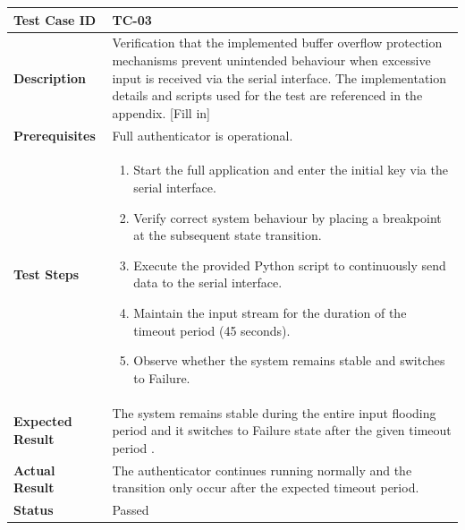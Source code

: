 \begin{table}[H]
\centering
\begin{tabular}{|p{3cm}|p{12cm}|}
\hline
\textbf{Test Case ID} & TC-03 \\ \hline
\textbf{Description} & Verification that the implemented buffer overflow protection mechanisms prevent unintended behaviour when excessive input is received via the serial interface. The implementation details and scripts used for the test are referenced in the appendix. [Fill in] \\ \hline
\textbf{Prerequisites} & Full authenticator is operational. \\ \hline
\textbf{Test Steps} &
\begin{enumerate}
\item Start the full application and enter the initial key via the serial interface.
\item Verify correct system behaviour by placing a breakpoint at the subsequent state transition.
\item Execute the provided Python script to continuously send data to the serial interface.
\item Maintain the input stream for the duration of the timeout period (45 seconds).
\item Observe whether the system remains stable and switches to Failure.
\end{enumerate}
\\ \hline
\textbf{Expected Result} & The system remains stable during the entire input flooding period and it switches to Failure state after the given timeout period . \\ \hline
\textbf{Actual Result} & The authenticator continues running normally and the transition only occur after the expected timeout period. \\ \hline
\textbf{Status} & \textcolor{green!60!black}{Passed} \\ \hline
\end{tabular}
\end{table}

